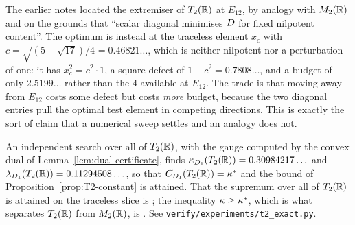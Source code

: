 \begin{remark}
\label{rem:T2-correction}
The earlier notes located the extremiser of $T_2(\mathbb{R})$ at $E_{12}$, by analogy
with $M_2(\mathbb{R})$ and on the grounds that ``scalar diagonal minimises $D$ for
fixed nilpotent content''.  The optimum is instead at the traceless element
$x_c$ with $c=\sqrt{(5-\sqrt{17})/4}=0.46821\ldots$, which is neither nilpotent
nor a perturbation of one: it has $x_c^2=c^2\cdot1$, a square defect of
$1-c^2=0.7808\ldots$, and a budget of only $2.5199\ldots$ rather than the $4$
available at $E_{12}$.  The trade is that moving away from $E_{12}$ costs some
defect but costs \emph{more} budget, because the two diagonal entries pull the
optimal test element in competing directions.  This is exactly the sort of claim
that a numerical sweep settles and an analogy does not.
\end{remark}

\begin{remark}
An independent search over all of $T_2(\mathbb{R})$, with the gauge computed by the
convex dual of Lemma~\ref{lem:dual-certificate}, finds
$\kappa_{D_1}(T_2(\mathbb{R}))=0.30984217\ldots$ and
$\lambda_{D_1}(T_2(\mathbb{R}))=0.11294508\ldots$, so that
$C_{D_1}(T_2(\mathbb{R}))=\kappa^*$ and the bound of
Proposition~\ref{prop:T2-constant} is attained.  That the supremum over all of
$T_2(\mathbb{R})$ is attained on the traceless slice is \statusnum; the inequality
$\kappa\ge\kappa^*$, which is what separates $T_2(\mathbb{R})$ from $M_2(\mathbb{R})$, is
\statusproved.  See \texttt{verify/experiments/t2\_exact.py}.
\end{remark}
